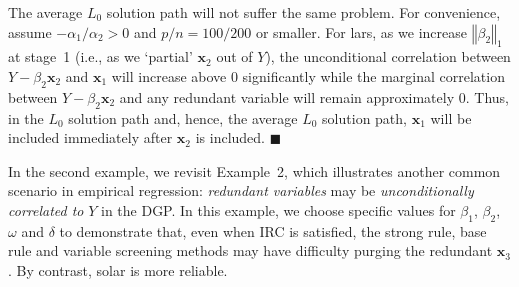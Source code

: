 \documentclass[12pt]{article}
\begin{document}
The average $L_0$ solution path will not suffer the same problem. For convenience, assume $-\alpha_1 / \alpha_2 > 0$ and $p/n = 100/200$ or smaller. For lars, as we increase $\left\Vert \beta_2 \right\Vert_1$ at stage~1 (i.e., as we `partial' $\mathbf{x}_2$ out of $Y$), the unconditional correlation between $Y - \beta_2 \mathbf{x}_2$ and $\mathbf{x}_1$ will increase above $0$ significantly while the marginal correlation between $Y - \beta_2 \mathbf{x}_2$ and any redundant variable will remain approximately $0$. Thus, in the $L_0$ solution path and, hence, the average $L_0$ solution path, $\mathbf{x}_1$ will be included immediately after $\mathbf{x}_2$ is included. $\blacksquare$

\bigskip
In the second example, we revisit Example~2, which illustrates another common scenario in empirical regression: \emph{redundant variables} may be \emph{unconditionally correlated to} $Y$ in the DGP. In this example, we choose specific values for $\beta_1$, $\beta_2$, $\omega$ and $\delta$ to demonstrate that, even when IRC is satisfied, the strong rule, base rule and variable screening methods may have difficulty purging the redundant $\mathbf{x}_3$. By contrast, solar is more reliable.
\end{document}

